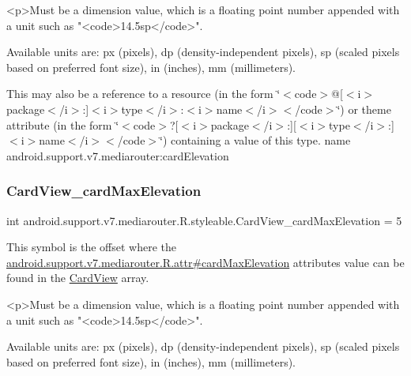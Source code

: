\begin{DoxyVerb}      <p>Must be a dimension value, which is a floating point number appended with a unit such as "<code>14.5sp</code>".
\end{DoxyVerb}
 Available units are\+: px (pixels), dp (density-\/independent pixels), sp (scaled pixels based on preferred font size), in (inches), mm (millimeters). 

This may also be a reference to a resource (in the form \char`\"{}$<$code$>$@\mbox{[}$<$i$>$package$<$/i$>$\+:\mbox{]}$<$i$>$type$<$/i$>$\+:$<$i$>$name$<$/i$>$$<$/code$>$\char`\"{}) or theme attribute (in the form \char`\"{}$<$code$>$?\mbox{[}$<$i$>$package$<$/i$>$\+:\mbox{]}\mbox{[}$<$i$>$type$<$/i$>$\+:\mbox{]}$<$i$>$name$<$/i$>$$<$/code$>$\char`\"{}) containing a value of this type.  name android.\+support.\+v7.\+mediarouter\+:card\+Elevation \mbox{\label{classandroid_1_1support_1_1v7_1_1mediarouter_1_1R_1_1styleable_ae32cba2f19b8ed4678602f08eb2cf8a9}} 
\subsubsection{\texorpdfstring{Card\+View\+\_\+card\+Max\+Elevation}{CardView\_cardMaxElevation}}
{\footnotesize\ttfamily int android.\+support.\+v7.\+mediarouter.\+R.\+styleable.\+Card\+View\+\_\+card\+Max\+Elevation = 5\hspace{0.3cm}{\ttfamily [static]}}

This symbol is the offset where the \hyperlink{classandroid_1_1support_1_1v7_1_1mediarouter_1_1R_1_1attr_a261321b379e1a19092487ee349c07fe5}{android.\+support.\+v7.\+mediarouter.\+R.\+attr\#card\+Max\+Elevation} attribute\textquotesingle{}s value can be found in the \hyperlink{classandroid_1_1support_1_1v7_1_1mediarouter_1_1R_1_1styleable_a58720bc744e6374c25e81b8ae15a2c6a}{Card\+View} array.

\begin{DoxyVerb}      <p>Must be a dimension value, which is a floating point number appended with a unit such as "<code>14.5sp</code>".
\end{DoxyVerb}
 Available units are\+: px (pixels), dp (density-\/independent pixels), sp (scaled pixels based on preferred font size), in (inches), mm (millimeters). 


